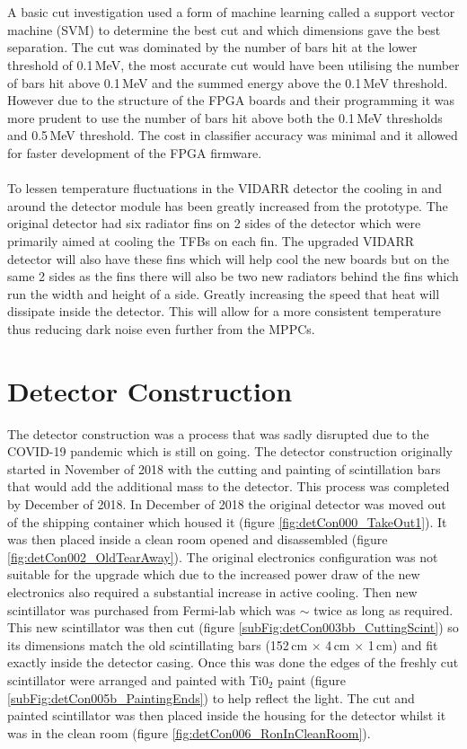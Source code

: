 \\\\A basic cut investigation used a form of machine learning called a support vector machine (SVM) to determine the best cut and which dimensions gave the best separation. The cut was dominated by the number of bars hit at the lower threshold of 0.1\,MeV, the most accurate cut would have been utilising the number of bars hit above 0.1\,MeV and the summed energy above the 0.1\,MeV threshold. However due to the structure of the FPGA boards and their programming it was more prudent to use the number of bars hit above both the 0.1\,MeV thresholds and 0.5\,MeV threshold. The cost in classifier accuracy was minimal and it allowed for faster development of the FPGA firmware. 
\\\\To lessen temperature fluctuations in the VIDARR detector the cooling in and around the detector module has been greatly increased from the prototype. The original detector had six radiator fins on 2 sides of the detector which were primarily aimed at cooling the TFBs on each fin. The upgraded VIDARR detector will also have these fins which will help cool the new boards but on the same 2 sides as the fins there will also be two new radiators behind the fins which run the width and height of a side. Greatly increasing the speed that heat will dissipate inside the detector. This will allow for a more consistent temperature  thus reducing dark noise even further from the MPPCs. 

\section{Detector Construction}\label{sec:DetectorConstruction}
The detector construction was a process that was sadly disrupted due to the COVID-19 pandemic which is still on going. The detector construction originally started in November of 2018 with the cutting and painting of scintillation bars that would add the additional mass to the detector. This process was completed by December of 2018. In December of 2018 the original detector was moved out of the shipping container which housed it (figure \ref{fig:detCon000_TakeOut1}). It was then placed inside a clean room opened and disassembled (figure \ref{fig:detCon002_OldTearAway}). The original electronics configuration was not suitable for the upgrade which due to the increased power draw of the new electronics also required a substantial increase in active cooling. Then new scintillator was purchased from Fermi-lab which was $\sim$ twice as long as required. This new scintillator was then cut (figure \ref{subFig:detCon003bb_CuttingScint}) so its dimensions match the old scintillating bars (152\,cm $\times$ 4\,cm $\times$ 1\,cm) and fit exactly inside the detector casing. Once this was done the edges of the freshly cut scintillator were arranged and painted with Ti0$_2$ paint (figure \ref{subFig:detCon005b_PaintingEnds}) to help reflect the light. The cut and painted scintillator was then placed inside the housing for the detector  whilst it was in the clean room (figure \ref{fig:detCon006_RonInCleanRoom}).

